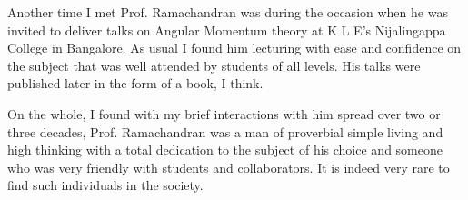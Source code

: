 \medskip

Another time I met Prof. Ramachandran was during the occasion when he was invited to deliver talks on Angular Momentum theory at K L E's Nijalingappa College in Bangalore. As usual I found him lecturing with ease and confidence on the subject that was well attended by students of all levels. His talks were published later in the form of a book, I think.

\medskip

On the whole, I found with my brief interactions with him spread over two or three decades, Prof. Ramachandran was a man of proverbial simple living and high thinking with a total dedication to the subject of his choice and someone who was very friendly with students and collaborators. It is indeed very rare to find such individuals in the society.



